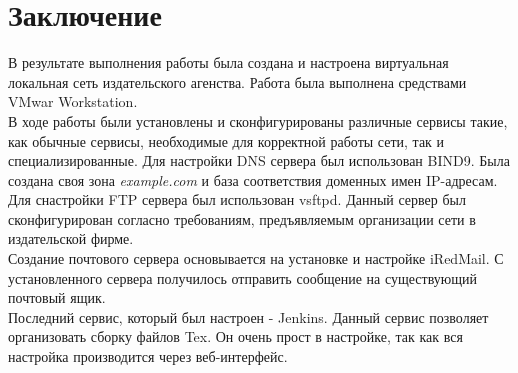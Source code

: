 \section*{Заключение}
В результате выполнения работы была создана и настроена виртуальная локальная сеть издательского агенства. Работа была выполнена средствами VMwar Workstation. \\
В ходе работы были установлены и сконфигурированы различные сервисы такие, как обычные сервисы, необходимые для корректной работы сети, так и специализированные. 
Для настройки DNS сервера был использован BIND9. Была создана своя зона \textit{example.com} и база соответствия доменных имен IP-адресам. \\
Для снастройки FTP сервера был использован vsftpd. Данный сервер был сконфигурирован согласно требованиям, предъявляемым организации сети в издательской фирме. \\
Создание почтового сервера основывается на установке и настройке iRedMail. С установленного сервера получилось отправить сообщение на существующий почтовый ящик. \\
Последний сервис, который был настроен - Jenkins. Данный сервис позволяет организовать сборку файлов Tex. Он очень прост в настройке, так как вся настройка производится через веб-интерфейс.


